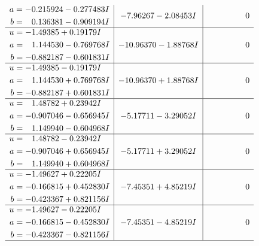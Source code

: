 \documentclass[1p]{elsarticle_modified}
\theoremstyle{definition}
\begin{document}
$$\begin{array}{c|c|c}
\begin{aligned}
a &= -0.215924 - 0.277483 I \\
b &= \phantom{-}0.136381 - 0.909194 I\end{aligned}
 & -7.96267 - 2.08453 I & \phantom{-0.000000 } 0 \\ \hline\begin{aligned}
u &= -1.49385 + 0.19179 I \\
a &= \phantom{-}1.144530 - 0.769768 I \\
b &= -0.882187 - 0.601831 I\end{aligned}
 & -10.96370 - 1.88768 I & \phantom{-0.000000 } 0 \\ \hline\begin{aligned}
u &= -1.49385 - 0.19179 I \\
a &= \phantom{-}1.144530 + 0.769768 I \\
b &= -0.882187 + 0.601831 I\end{aligned}
 & -10.96370 + 1.88768 I & \phantom{-0.000000 } 0 \\ \hline\begin{aligned}
u &= \phantom{-}1.48782 + 0.23942 I \\
a &= -0.907046 - 0.656945 I \\
b &= \phantom{-}1.149940 - 0.604968 I\end{aligned}
 & -5.17711 - 3.29052 I & \phantom{-0.000000 } 0 \\ \hline\begin{aligned}
u &= \phantom{-}1.48782 - 0.23942 I \\
a &= -0.907046 + 0.656945 I \\
b &= \phantom{-}1.149940 + 0.604968 I\end{aligned}
 & -5.17711 + 3.29052 I & \phantom{-0.000000 } 0 \\ \hline\begin{aligned}
u &= -1.49627 + 0.22205 I \\
a &= -0.166815 + 0.452830 I \\
b &= -0.423367 + 0.821156 I\end{aligned}
 & -7.45351 + 4.85219 I & \phantom{-0.000000 } 0 \\ \hline\begin{aligned}
u &= -1.49627 - 0.22205 I \\
a &= -0.166815 - 0.452830 I \\
b &= -0.423367 - 0.821156 I\end{aligned}
 & -7.45351 - 4.85219 I & \phantom{-0.000000 } 0\\
 \hline 
 \end{array}$$\newpage$$\begin{array}{c|c|c}  

\end{array}$$
\end{document}
